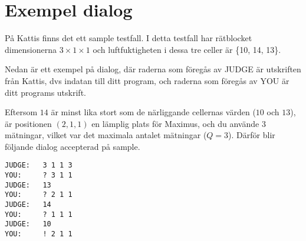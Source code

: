 \section*{Exempel dialog}
På Kattis finns det ett sample testfall. I detta testfall har rätblocket dimensionerna $3\times 1\times 1$ och luftfuktigheten i dessa tre celler är \{10, 14, 13\}.

Nedan är ett exempel på dialog, där raderna som föregås av JUDGE är utskriften från Kattis, dvs indatan till ditt program, och raderna som föregås av YOU är ditt programs utskrift.

Eftersom $14$ är minst lika stort som de närliggande cellernas värden ($10$ och $13$), är positionen $(2, 1, 1)$ en lämplig plats för Maximus, och du använde 3 mätningar, vilket var det maximala antalet mätningar ($Q=3$). Därför blir följande dialog accepterad på sample.

\begin{verbatim}
JUDGE:   3 1 1 3
YOU:     ? 3 1 1
JUDGE:   13
YOU:     ? 2 1 1
JUDGE:   14
YOU:     ? 1 1 1
JUDGE:   10
YOU:     ! 2 1 1
\end{verbatim}
